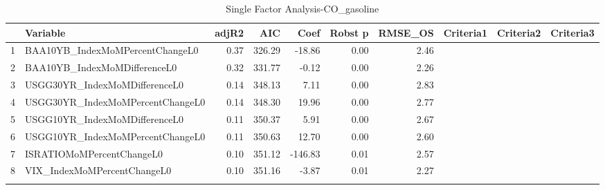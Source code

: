 \begin{longtable}{rlrrrrrlll}
  \hline
 & Variable & adjR2 & AIC & Coef & Robst p & RMSE\_OS & Criteria1 & Criteria2 & Criteria3 \\ 
  \hline
1 & BAA10YB\_IndexMoMPercentChangeL0 & 0.37 & 326.29 & -18.86 & 0.00 & 2.46 &  &  &  \\ 
  2 & BAA10YB\_IndexMoMDifferenceL0 & 0.32 & 331.77 & -0.12 & 0.00 & 2.26 &  &  &  \\ 
  3 & USGG30YR\_IndexMoMDifferenceL0 & 0.14 & 348.13 & 7.11 & 0.00 & 2.83 &  &  &  \\ 
  4 & USGG30YR\_IndexMoMPercentChangeL0 & 0.14 & 348.30 & 19.96 & 0.00 & 2.77 &  &  &  \\ 
  5 & USGG10YR\_IndexMoMDifferenceL0 & 0.11 & 350.37 & 5.91 & 0.00 & 2.67 &  &  &  \\ 
  6 & USGG10YR\_IndexMoMPercentChangeL0 & 0.11 & 350.63 & 12.70 & 0.00 & 2.60 &  &  &  \\ 
  7 & ISRATIOMoMPercentChangeL0 & 0.10 & 351.12 & -146.83 & 0.01 & 2.57 &  &  &  \\ 
  8 & VIX\_IndexMoMPercentChangeL0 & 0.10 & 351.16 & -3.87 & 0.01 & 2.27 &  &  &  \\ 
   \hline
\hline
\caption{Single Factor Analysis-CO_gasoline} 
\end{longtable}
